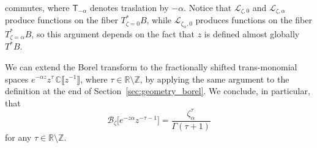 \documentclass{article}
\newcommand{\Z}{\mathbb{Z}}
\newcommand{\R}{\mathbb{R}}
\newcommand{\C}{\mathbb{C}}
\newcommand{\laplace}{\mathcal{L}}
\newcommand{\borel}{\mathcal{B}}
\theoremstyle{definition}
\theoremstyle{plain}
\begin{document}
commutes, where $\mathsf{T}_{-\alpha}$ denotes traslation by $-\alpha$. Notice that $\laplace_{\zeta, 0}$ and $\laplace_{\zeta, \alpha}$ produce functions on the fiber $T^*_{\zeta = 0}B$, while $\laplace_{\zeta_\alpha, 0}$ produces functions on the fiber $T^*_{\zeta = \alpha}B$, so this argument depends on the fact that $z$ is defined almost globally $T^*B$.

We can extend the Borel transform to the fractionally shifted trans-monomial spaces $e^{-\alpha z} z^\tau\,\C\llbracket z^{-1} \rrbracket$, where $\tau \in \R \setminus \Z$, by applying the same argument to the definition at the end of Section~\ref{sec:geometry_borel}. We conclude, in particular, that
\[\borel_{\zeta}\big[e^{-z\alpha}z^{-\tau-1}\big] = \frac{\zeta_\alpha^\tau}{\Gamma(\tau+1)}\]
for any $\tau \in \R\setminus\Z$.
\end{document}
